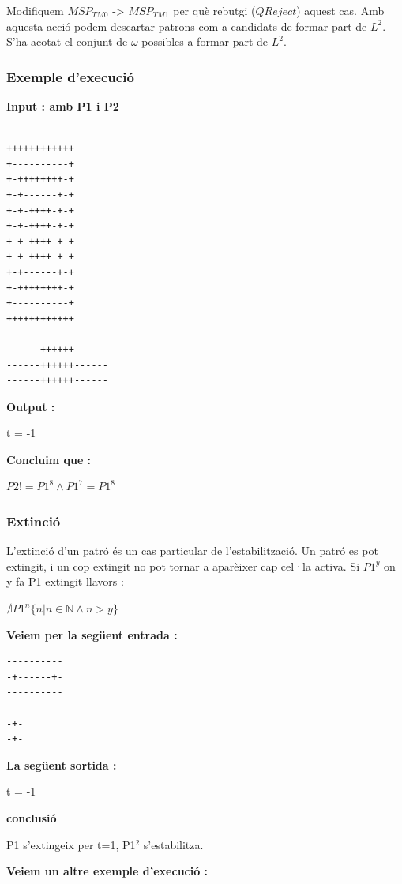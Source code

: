 \documentclass[12pt,a4paper]{report}
\def \w{$\omega$}
\def \tmz{$MSP_{TM0} $}
\def \tmu{$MSP_{TM1} $}
\def \ld{$L^{2}$}
\begin{document}
Modifiquem \tmz{} -> \tmu{} per què rebutgi ($QReject$) aquest cas. Amb aquesta acció podem descartar patrons com a candidats de formar part de \ld{}. S’ha acotat el conjunt de \w{} possibles a formar part de \ld{}.

\subsubsection{Exemple d'execució}

\textbf{Input : amb P1 i P2}

\begin{lstlisting}

++++++++++++
+----------+
+-++++++++-+
+-+------+-+
+-+-++++-+-+
+-+-++++-+-+
+-+-++++-+-+
+-+-++++-+-+
+-+------+-+
+-++++++++-+
+----------+
++++++++++++

------++++++------
------++++++------
------++++++------

\end{lstlisting}

\textbf{Output :}

t = -1

\textbf{Concluim que :}

$P2 != P1^8 \wedge P1^7 = P1^8$

\subsubsection{Extinció}

L’extinció d’un patró és un cas particular de l’estabilització. Un patró es pot extingit, i un cop extingit no pot tornar a aparèixer cap cel·la activa. Si $P1^y$ on y fa P1 extingit llavors : 

\begin{center}
$\nexists P1^n \{n | n \in \mathbb{N} \wedge n > y\}$
\end{center}

\textbf{Veiem per la següent entrada :}

\begin{lstlisting}
----------
-+------+-
----------

-+-
-+-
\end{lstlisting}

\textbf{La següent sortida :}

t = -1


\textbf{conclusió}

P1 s'extingeix per t=1, P1$^2$ s'estabilitza.


\textbf{Veiem un altre exemple d’execució : }
\end{document}

